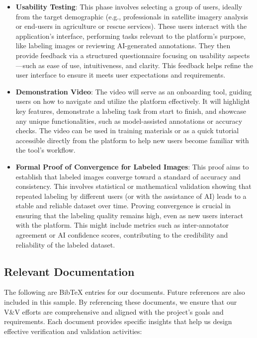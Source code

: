 \documentclass[12pt, titlepage]{article}
\begin{document}
\begin{itemize}
    \item \textbf{Usability Testing}: This phase involves selecting a group of users, ideally from the target demographic (e.g., professionals in satellite imagery analysis or end-users in agriculture or rescue services). These users interact with the application's interface, performing tasks relevant to the platform's purpose, like labeling images or reviewing AI-generated annotations. They then provide feedback via a structured questionnaire focusing on usability aspects—such as ease of use, intuitiveness, and clarity. This feedback helps refine the user interface to ensure it meets user expectations and requirements.

    \item \textbf{Demonstration Video}: The video will serve as an onboarding tool, guiding users on how to navigate and utilize the platform effectively. It will highlight key features, demonstrate a labeling task from start to finish, and showcase any unique functionalities, such as model-assisted annotations or accuracy checks. The video can be used in training materials or as a quick tutorial accessible directly from the platform to help new users become familiar with the tool's workflow.

    \item \textbf{Formal Proof of Convergence for Labeled Images}: This proof aims to establish that labeled images converge toward a standard of accuracy and consistency. This involves statistical or mathematical validation showing that repeated labeling by different users (or with the assistance of AI) leads to a stable and reliable dataset over time. Proving convergence is crucial in ensuring that the labeling quality remains high, even as new users interact with the platform. This might include metrics such as inter-annotator agreement or AI confidence scores, contributing to the credibility and reliability of the labeled dataset.
\end{itemize}
  
\subsection{Relevant Documentation}

\bigskip

The following are BibTeX entries for our documents. Future references are also included in this sample. By referencing these documents, we ensure that our V\&V efforts are comprehensive and aligned with the project's goals and requirements. Each document provides specific insights that help us design effective verification and validation activities:
\end{document}
